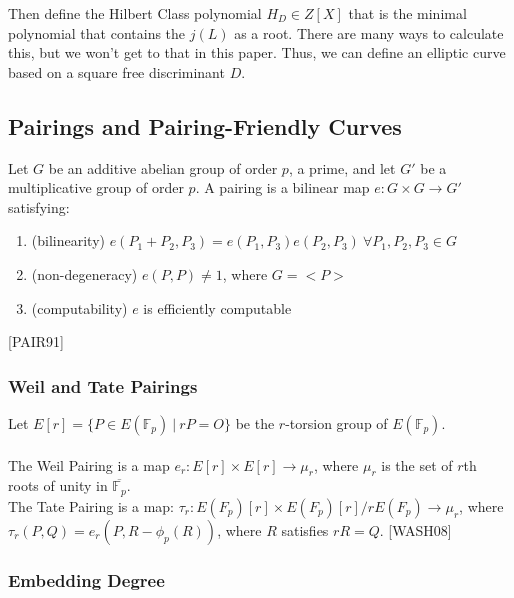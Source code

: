 \documentclass[12pt,twoside]{article}
\newcommand\given[1][]{\:#1\vert\:}
\begin{document}
Then define the Hilbert Class polynomial $H_{D} \in Z[X]$ that is the minimal polynomial that contains the $j(L)$ as a root. There are many ways to calculate this, but we won't get to that in this paper. Thus, we can define an elliptic curve based on a square free discriminant $D$.  

\subsection{Pairings and Pairing-Friendly Curves}
Let $G$ be an additive abelian group of order $p$, a prime, and let $G'$ be a multiplicative group of order $p$. A pairing is a bilinear map $e: G \times G \to G'$ satisfying:
\begin{enumerate}
\item (bilinearity) $e(P_1 + P_2, P_3) = e(P_1,P_3)e(P_2,P_3) \ \forall P_1,P_2,P_3 \in G$
\item (non-degeneracy) $e(P,P) \ne 1$, where $G = \mathopen{<} P \mathopen{>}$
\item (computability) $e$ is efficiently computable
\end{enumerate} [PAIR91]
\subsubsection{Weil and Tate Pairings}
Let $E[r] = \{ P \in E(\mathbb F_p) \given rP = O\}$ be the $r$-torsion group of $E(\mathbb F_p)$.
\\ \\
\noindent The Weil Pairing is a map $e_r: E[r] \times E[r] \to \mu_r$, where $\mu_{r}$ is the set of $r$th roots of unity in $\overline{\mathbb F_p}$. \\ 

\noindent The Tate Pairing is a map: $\tau_r: E(F_p)[r] \times E(F_p)[r]/ rE(F_p) \to \mu_r$, where $\tau_r(P,Q) = e_r(P, R - \phi_p(R))$, where $R$ satisfies $r R = Q$. [WASH08]



 \subsubsection{Embedding Degree}
 
\end{document}
